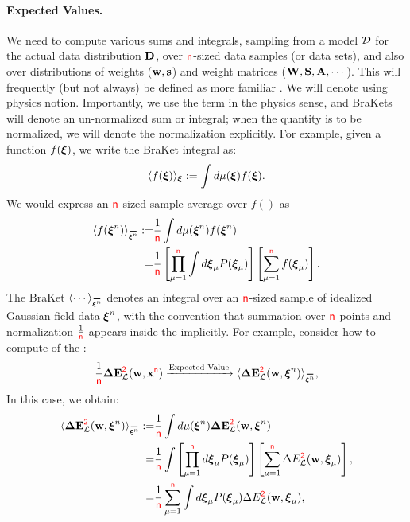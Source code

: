 \paragraph{Expected Values.}

We need to compute various sums and integrals, sampling from a model $\mathcal{D}$ for the actual data distribution $\mathbf{D}$,  over ${\color{red}\sf{n}}$-sized data samples (or data sets), and also over distributions of weights (${\mathbf{w}}, {\mathbf{s}}$) and weight matrices (${\mathbf{W}}, {\mathbf{S}}, \mathbf{A}, \cdots$).
This will frequently (but not always) be defined as more familiar \ExpectedValues.
We will denote \ExpectedValues using physics \BraKet notion.
Importantly, we use the term \ExpectedValue in the physics sense, and BraKets will denote an un-normalized sum or integral;
when the quantity is to be normalized, we will denote the normalization explicitly.
For example, given a function $f(\boldsymbol{\xi})$, we write the BraKet integral as:
\begin{align}
 \label{eqn:EuT}
 \langle f(\boldsymbol{\xi}) \rangle_{\boldsymbol{\xi}}:=\int d\mu(\boldsymbol{\xi}) f(\boldsymbol{\xi})  .
\end{align}
We would express an ${\color{red}\sf{n}}$-sized sample average over $f()$ as 
\begin{align}
    \label{eqn:EuT_normalized}
    \langle f(\NDXIn) \rangle_{\AVGNDXIn} :=& \frac{1}{\ND} \int d\mu(\NDXIn) f(\NDXIn) \nonumber \\
    =& \frac{1}{\ND} \left[\prod_{\mu=1}^{\ND} \int d\XI_{\mu}P(\XI_{\mu}) \right] \left[ \sum_{\mu=1}^{\ND}f(\XI_{\mu}) \right].
\end{align}
The BraKet $\langle\cdots\rangle_{\AVGNDXIn}$ denotes an integral over an ${\color{red}\sf{n}}$-sized sample of idealized
Gaussian-field data $\boldsymbol{\xi}^{n}$, with the convention that summation over ${\color{red}\sf{n}}$ points and normalization $\tfrac{1}{{\color{red}\sf{n}}}$
appears inside the \BraKet implicitly.
For example, consider how to compute \ExpectedValue of the \DataSampleError:
\begin{align}
  \label{eqn:Emap}
  \frac{1}{\ND}\DETOPX \xrightarrow{\text{Expected Value}} \langle \DETOPXI \rangle_{\AVGNDXIn}  , %
\end{align}
In this case, we obtain:
\begin{align}
\nonumber
  \langle \DETOPXI\rangle_{\AVGNDXIn}
  :=  &\frac{1}{\ND}\int d\mu(\NDXIn) \DETOPXI \\ 
  = &
  \frac{1}{\ND}\int \left[ \prod_{\mu=1}^{\ND}d\XI_{\mu}P(\XI_{\mu})\right] \left[ \sum_{\mu=1}^{\ND}\DETmu \right] , \\ \nonumber
  = &
  \frac{1}{\ND}\sum_{\mu=1}^{\ND}\int d\XI_{\mu}P(\XI_{\mu})\DETmu  , 
    \label{eqn:average_data_sample_error}
\end{align}
